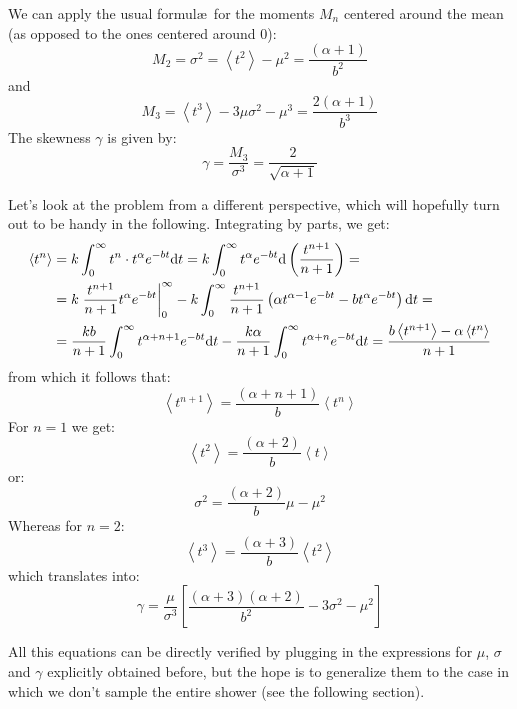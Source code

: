 \documentclass[a4paper,11pt]{article}
\newcommand{\diff}{{\rm d}}
\begin{document}
We can apply the usual formul\ae\ for the moments $M_n$ centered around the
mean (as opposed to the ones centered around 0):
\begin{equation}
M_2 = \sigma^2 = \left< t^2 \right> - \mu^2 =
\frac{(\alpha + 1)}{b^2}
\end{equation}
and
\begin{equation}
M_3 = \left< t^3 \right> - 3\mu\sigma^2 - \mu^3 = \frac{2(\alpha + 1)}{b^3}
\end{equation}
The skewness $\gamma$ is given by:
\begin{equation}
\gamma = \frac{M_3}{\sigma^3} = \frac{2}{\sqrt{\alpha + 1}}
\end{equation}

Let's look at the problem from a different perspective, which will hopefully
turn out to be handy in the following. Integrating by parts, we get:
\begin{align*}
\left< t^n \right> & = k \int_{0}^\infty t^n \cdot t^\alpha e^{-bt} \diff t =
k \int_{0}^\infty t^\alpha e^{-bt} \diff\left(\frac{t^{n+1}}{n+1}\right) =\\
&= k\left.\frac{t^{n+1}}{n+1}  t^\alpha e^{-bt}\right|_0^\infty -
k \int_0^\infty \frac{t^{n+1}}{n+1} \left(
\alpha t^{\alpha - 1}e^{-bt} - bt^\alpha e^{-bt}
\right) \diff t =\\
&= \frac{kb}{n+1} \int_{0}^\infty  t^{\alpha + n + 1} e^{-bt} \diff t -
\frac{k\alpha}{n+1} \int_{0}^\infty  t^{\alpha + n} e^{-bt} \diff t =
\frac{b \left< t^{n+1} \right> - \alpha\left< t^n \right>}{n+1}
\end{align*}
from which it follows that:
\begin{equation}
\left< t^{n+1} \right> = \frac{(\alpha + n + 1)}{b}\left< t^n \right>
\end{equation}
For $n = 1$ we get:
$$
\left< t^2 \right> = \frac{(\alpha + 2)}{b}\left< t \right>
$$
or:
\begin{equation}
\sigma^2 = \frac{(\alpha + 2)}{b}\mu - \mu^2
\end{equation}
Whereas for $n = 2$:
$$
\left< t^3 \right> = \frac{(\alpha + 3)}{b}\left< t^2 \right>
$$
which translates into:
\begin{equation}
\gamma = \frac{\mu}{\sigma^3}\left[
  \frac{(\alpha + 3)(\alpha + 2)}{b^2} - 3\sigma^2 - \mu^2
  \right]
\end{equation}

All this equations can be directly verified by plugging in the expressions
for $\mu$, $\sigma$ and $\gamma$ explicitly obtained before, but the hope is
to generalize them to the case in which we don't sample the entire shower
(see the following section).
\end{document}
